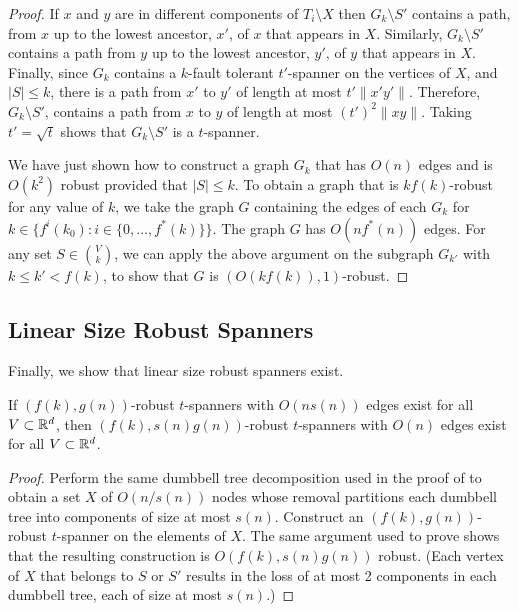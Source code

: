 \documentclass{patmorin}
\begin{document}
\begin{proof}
If $x$ and $y$ are in different components of $T_i\setminus X$ then
$G_k\setminus S'$ contains a path, from $x$ up to the lowest ancestor,
$x'$, of $x$ that appears in $X$.  Similarly, $G_k\setminus S'$ contains
a path from $y$ up to the lowest ancestor, $y'$, of $y$ that appears
in $X$.  Finally, since $G_k$ contains a $k$-fault tolerant $t'$-spanner
on the vertices of $X$, and $|S|\le k$, there is a path from $x'$ to
$y'$ of length at most $t'\|x'y'\|$.  Therefore, $G_k\setminus S'$,
contains a path from $x$ to $y$ of length at most $(t')^2\|xy\|$.
Taking $t'=\sqrt{t}$ shows that $G_k\setminus S'$ is a $t$-spanner.

We have just shown how to construct a graph $G_k$ that has $O(n)$ edges
and is $O(k^2)$ robust provided that $|S|\le k$.  To obtain a graph that
is $kf(k)$-robust for any value of $k$, we take the graph $G$ containing
the edges of each $G_k$ for $k\in\{f^i(k_0) : i\in\{0,\ldots,f^*(k)\}\}$.
The graph $G$ has $O(nf^*(n))$ edges.  For any set $S\in \binom{V}{k}$,
we can apply the above argument on the subgraph $G_{k'}$ with $k \le k'
< f(k)$, to show that $G$ is $(O(kf(k)),1)$-robust.
\end{proof}

\subsection{Linear Size Robust Spanners}

Finally, we show that linear size robust spanners exist.

\begin{thm}
If $(f(k),g(n))$-robust $t$-spanners with $O(n s(n))$ edges exist for all
$V\subset\mathbb{R}^d$, then $(f(k),s(n)g(n))$-robust $t$-spanners with $O(n)$
edges exist for all $V\subset\mathbb{R}^d$.
\end{thm}

\begin{proof}
Perform the same dumbbell tree decomposition used in the proof of
 to obtain a set $X$ of $O(n/s(n))$ nodes whose removal
partitions each dumbbell tree into components of size at most $s(n)$.
Construct an $(f(k),g(n))$-robust $t$-spanner on the elements of $X$.
The same argument used to prove  shows that the resulting
construction is $O(f(k),s(n)g(n))$ robust.  (Each vertex of $X$ that
belongs to $S$ or $S'$ results in the loss of at most 2 components in
each dumbbell tree, each of size at most $s(n)$.)
\end{proof}
\end{document}
